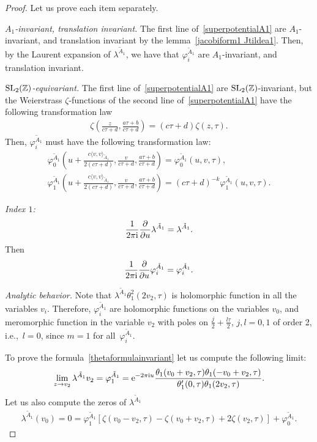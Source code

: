 \documentclass[10pt,a4paper]{amsart}
\numberwithin{equation}{section}
\begin{document}
\begin{proof}
Let us prove each item separately.

\textit{$A_1$-invariant, translation invariant.}
The first line of~\eqref{superpotentialA1} are $A_1$-invariant, and translation invariant by the lemma~\eqref{jacobiform1 Jtildea1}. Then, by the Laurent expansion of $\lambda^{\tilde A_1}$, we have that $\varphi_i^{\tilde A_1}$ are $A_1$-invariant, and translation invariant.

\textit{${\rm SL}_2(\mathbb{Z})$-equivariant.}
The first line of~\eqref{superpotentialA1} are ${\rm SL}_2(\mathbb{Z})$-invariant, but the Weierstrass $\zeta$-functions of the second line of~\eqref{superpotentialA1} have the following transformation law
\begin{gather*}
\zeta\left(\frac{z}{c\tau+d},\frac{a\tau+b}{c\tau+d}\right)=(c\tau+d)\zeta(z,\tau).
\end{gather*}
Then, $\varphi_i^{\tilde A_1}$ must have the following transformation law:
\begin{gather*}
\varphi_0^{\tilde A_1}\left(u+\frac{c\langle v,v \rangle_{\tilde A_1}}{2(c\tau+d)},\frac{v}{c\tau+d},\frac{a\tau+b}{c\tau+d}\right)=\varphi_0^{\tilde A_1}(u,v,\tau),
\\
\varphi_1^{\tilde A_1}\left(u+\frac{c\langle v,v\rangle_{\tilde A_1}}{2(c\tau+d)},\frac{v}{c\tau+d},\frac{a\tau+b}{c\tau+d}\right)=(c\tau+d)^{-k}\varphi_1^{\tilde A_1}(u,v,\tau).
\end{gather*}

\textit{Index $1$:}
\begin{gather*}
\frac{1}{2\pi {\rm i}}\frac{\partial}{\partial u}\lambda^{\tilde A_1}=\lambda^{\tilde A_1}.
\end{gather*}
Then
\begin{gather*}
\frac{1}{2\pi {\rm i}}\frac{\partial}{\partial u}\varphi_i^{\tilde A_1}=\varphi_i^{\tilde A_1}.
\end{gather*}

\textit{Analytic behavior.}
Note that $\lambda^{\tilde A_1}\theta_1^2(2v_2,\tau)$ is holomorphic function in all the variables $v_i$. Therefore, $\varphi_i^{\tilde A_1}$ are holomorphic functions on the variables $v_0$, and meromorphic function in the variable $v_{2}$ with poles on $\frac{j}{2}+\frac{l\tau}{2}$, $j,l=0,1$ of order 2, i.e.,~$l=0$, since $m=1$ for all~$\varphi_i^{\tilde A_1}$.

To prove the formula~\eqref{thetaformulainvariant} let us compute the following limit:
\begin{gather*}
\lim_{z\to v_2}\lambda^{\tilde A_1}v_2=\varphi_1^{\tilde A_1}
={\rm e}^{-2\pi {\rm i} u}\frac{\theta_1(v_0+v_2,\tau)\theta_1(-v_0+v_2,\tau)}
{\theta^{\prime}_1(0,\tau)\theta_1(2v_2,\tau)}.
\end{gather*}
Let us also compute the zeros of $\lambda^{\tilde A_1}$
\begin{gather*}
\lambda^{\tilde A_1}(v_0)=0=\varphi_{1}^{\tilde A_1}\left[\zeta(v_0-v_2,\tau)-\zeta(v_0+v_{2},\tau)+2\zeta(v_2,\tau)\right]+\varphi_0^{\tilde A_1}.
\tag*{\qed}
\end{gather*}
\renewcommand{\qed}{}
\end{proof}
\end{document}
